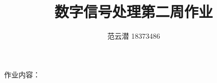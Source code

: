 \documentclass[lang=cn,11pt,a4paper,cite=authoryear]{elegantpaper}
\title{数字信号处理\quad 第二周作业}
\author{范云潜 18373486}
\institute{微电子学院 184111 班}
\date{\zhtoday}
\begin{document}
\maketitle

作业内容：

\tableofcontents


\end{document}
